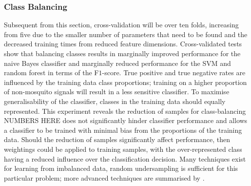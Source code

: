             
            
   

        \subsubsection{Class Balancing}
        \label{subsubsec:exp-clf-opt-class}
            Subsequent from this section, cross-validation will be over ten folds, increasing from five due to the smaller number of parameters that need to be found and the decreased training times from reduced feature dimensions. Cross-validated tests show that balancing classes results in marginally improved performance for the naive Bayes classifier and marginally reduced performance for the SVM and random forest in terms of the F$1$-score. True positive and true negative rates are influenced by the training data class proportions; training on a higher proportion of non-mosquito signals will result in a less sensitive classifier. To maximise generalisability of the classifier, classes in the training data should equally represented. This experiment reveals the reduction of samples for class-balancing NUMBERS HERE does not significantly hinder classifier performance and allows a classifier to be trained with minimal bias from the proportions of the training data. Should the reduction of samples significantly affect performance, then weightings could be applied to training samples, with the over-represented class having a reduced influence over the classification decision. Many techniques exist for learning from imbalanced data, random undersampling is sufficient for this particular problem; more advanced techniques are summarised by \textcite{He2009}.
            
